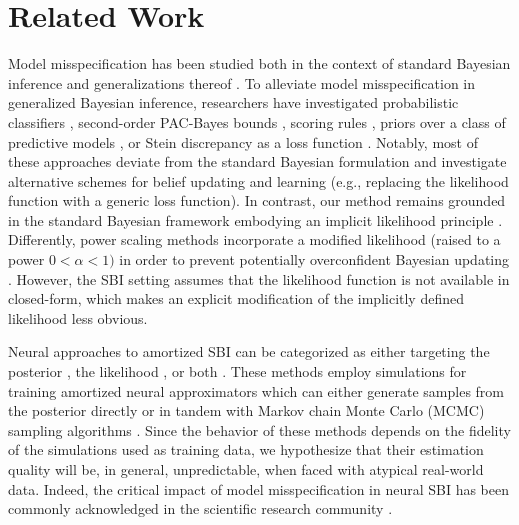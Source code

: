 \documentclass[twoside,11pt]{article}
\newcommand{\0}{\boldsymbol{0}}
\renewcommand{\cite}[1]{\citep{#1}}
\begin{document}
\section{Related Work}\label{sec:related-work}
Model misspecification has been studied both in the context of standard Bayesian inference and generalizations thereof \citep[i.e., generalized Bayesian inference, see][]{knoblauch2019generalized, schmon_generalized_2021}.
To alleviate model misspecification in generalized Bayesian inference, researchers have investigated probabilistic classifiers \citep{mms_genbayes}, second-order PAC-Bayes bounds \citep{masegosa2020learning}, scoring rules \citep{giummole2019objective}, priors over a class of predictive models \citep{loaiza2021focused}, or Stein discrepancy as a loss function \citep{matsubara_robust_2022}.
Notably, most of these approaches deviate from the standard Bayesian formulation and investigate alternative schemes for belief updating and learning (e.g., replacing the likelihood function with a generic loss function).
In contrast, our method remains grounded in the standard Bayesian framework embodying an implicit likelihood principle \cite{berger_likelihood_1988}.
Differently, power scaling methods incorporate a modified likelihood (raised to a power $0 < \alpha < 1)$ in order to prevent potentially overconfident Bayesian updating \cite{bayesian_miss, holmes2017assigning}.
However, the SBI setting assumes that the likelihood function is not available in closed-form, which makes an explicit modification of the implicitly defined likelihood less obvious.

Neural approaches to amortized SBI can be categorized as either targeting the posterior \cite{bayesflow, apt}, the likelihood \cite{snle, ratios}, or both \cite{snpla}.
These methods employ simulations for training amortized neural approximators which can either generate samples from the posterior directly \cite{bayesflow, apt, snpla} or in tandem with Markov chain Monte Carlo (MCMC) sampling algorithms \cite{snle, ratios}.
Since the behavior of these methods depends on the fidelity of the simulations used as training data, we hypothesize that their estimation quality will be, in general, unpredictable, when faced with atypical real-world data.
Indeed, the critical impact of model misspecification in neural SBI has been commonly acknowledged in the scientific research community \cite{cannon_investigating_2022, alquier_concentration_2019, zhang_convergence_2020, frazier_model_2020, frazier_robust_2021, pacchiardi_score_2022}.
\end{document}
